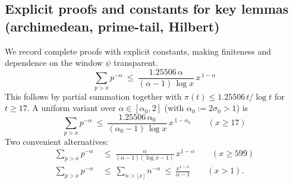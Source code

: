 \documentclass[11pt]{article}
\theoremstyle{definition}
\theoremstyle{remark}
\begin{document}
\subsection*{Explicit proofs and constants for key lemmas (archimedean, prime-tail, Hilbert)}
We record complete proofs with explicit constants, making finiteness and dependence on the window $\psi$ transparent.
\begin{equation}\label{eq:P1}
 \sum_{p>x} p^{-\alpha}\ \le\ \frac{1.25506\,\alpha}{(\alpha-1)\,\log x}\,x^{\,1-\alpha}
\end{equation}
This follows by partial summation together with $\pi(t)\le 1.25506\,t/\log t$ for $t\ge 17$. A uniform variant over $\alpha\in[\alpha_0,2]$ (with $\alpha_0:=2\sigma_0>1$) is
\begin{equation}\label{eq:P1uniform}
 \sum_{p>x} p^{-\alpha}\ \le\ \frac{1.25506\,\alpha_0}{(\alpha_0-1)\,\log x}\,x^{\,1-\alpha_0}\qquad(x\ge 17)
\end{equation}
Two convenient alternatives:
\begin{align}
 \sum_{p>x}p^{-\alpha}&\ \le\ \frac{\alpha}{(\alpha-1)(\log x-1)}\,x^{1-\alpha}\qquad(x\ge 599)\label{eq:P1dusart}\\
 \sum_{p>x}p^{-\alpha}&\ \le\ \sum_{n>\lfloor x\rfloor}n^{-\alpha}\ \le\ \frac{x^{1-\alpha}}{\alpha-1}\qquad(x>1).\label{eq:P1triv}
\end{align}
\end{document}

